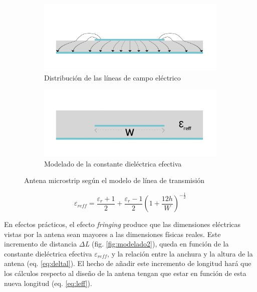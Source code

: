 \begin{figure}[h]
     \centering
     \begin{subfigure}[b]{0.7\textwidth}
         \centering
         \includegraphics[width=\textwidth]{archivos/parche/Fringing}
         \caption{Distribución de las líneas de campo eléctrico}
         \label{fig:fringing}
     \end{subfigure}
     \hfill
     \begin{subfigure}[b]{0.7\textwidth}
         \centering
         \includegraphics[width=\textwidth]{archivos/parche/ereff}
         \caption{Modelado de la constante dieléctrica efectiva}
         \label{fig:ereff}
     \end{subfigure}
     \hfill
        \caption{Antena microstrip según el modelo de línea de transmisión}
        \label{fig:modelado}
\end{figure}

\begin{equation}
	\varepsilon _{reff}=\frac{\varepsilon _{r}+1}{2}+\frac{\varepsilon _{r}-1}{2}\left ( 1+\frac{12h}{W} \right )^{-\frac{1}{2}}
	\label{eq:ereff}
\end{equation}

\par En efectos prácticos, el efecto \textit{fringing} produce que las dimensiones eléctricas vistas por la antena sean mayores a las dimensiones físicas reales. Este incremento de distancia \textit{$\Delta$L} (fig. \ref{fig:modelado2}), queda en función de la constante dieléctrica efectiva $\varepsilon_{reff}$, y la relación entre la anchura y la altura de la antena (eq. \ref{eq:deltal}). El hecho de añadir este incremento de longitud hará que los cálculos respecto al diseño de la antena tengan que estar en función de esta nueva longitud (eq. \ref{eq:leff}).

